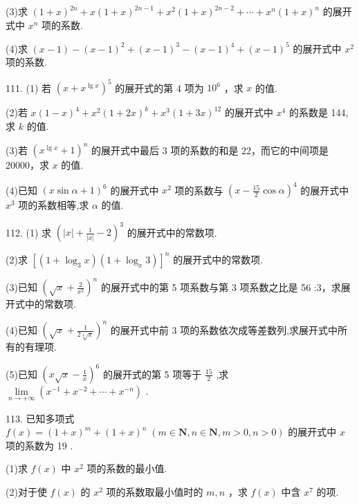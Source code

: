 \documentclass[10pt]{article}
\begin{document}
(3)求 \({\left( 1 + x\right) }^{2n} + x{\left( 1 + x\right) }^{{2n} - 1} + {x}^{2}{\left( 1 + x\right) }^{{2n} - 2} + \cdots  + {x}^{n}{\left( 1 + x\right) }^{n}\) 的展开式中 \({x}^{n}\) 项的系数.

(4)求 \(\left( {x - 1}\right)  - {\left( x - 1\right) }^{2} + {\left( x - 1\right) }^{3} - {\left( x - 1\right) }^{4} + {\left( x - 1\right) }^{5}\) 的展开式中 \({x}^{2}\) 项的系数.

111. (1) 若 \({\left( x + {x}^{\lg x}\right) }^{5}\) 的展开式的第 4 项为 \({10}^{6}\) ，求 \(x\) 的值.

(2)若 \(x{\left( 1 - x\right) }^{4} + {x}^{2}{\left( 1 + 2x\right) }^{k} + {x}^{3}{\left( 1 + 3x\right) }^{12}\) 的展开式中 \({x}^{4}\) 的系数是 144,求 \(k\) 的值.

(3)若 \({\left( {x}^{\lg x} + 1\right) }^{n}\) 的展开式中最后 3 项的系数的和是 22，而它的中间项是 20000，求 \(x\) 的值.

(4)已知 \({\left( x\sin \alpha  + 1\right) }^{6}\) 的展开式中 \({x}^{2}\) 项的系数与 \({\left( x - \frac{15}{2}\cos \alpha \right) }^{4}\) 的展开式中 \({x}^{3}\) 项的系数相等,求 \(\alpha\) 的值.

112. (1) 求 \({\left( \left| x\right|  + \frac{1}{\left| x\right| } - 2\right) }^{3}\) 的展开式中的常数项.

(2)求 \({\left\lbrack  \left( 1 + {\log }_{3}x\right) \left( 1 + {\log }_{x}3\right) \right\rbrack  }^{n}\) 的展开式中的常数项.

(3)已知 \({\left( \sqrt{x} + \frac{2}{{x}^{2}}\right) }^{n}\) 的展开式中的第 5 项系数与第 3 项系数之比是 56 :3，求展开式中的常数项.

(4)已知 \({\left( \sqrt{x} + \frac{1}{2\sqrt[4]{x}}\right) }^{n}\) 的展开式中前 3 项的系数依次成等差数列,求展开式中所有的有理项.

(5)已知 \({\left( x\sqrt{x} - \frac{1}{x}\right) }^{6}\) 的展开式的第 5 项等于 \(\frac{15}{2}\) ,求 \(\mathop{\lim }\limits_{{n \rightarrow   + \infty }}\left( {{x}^{-1} + {x}^{-2} + \cdots  + {x}^{-n}}\right)\) .

113. 已知多项式 \(f\left( x\right)  = {\left( 1 + x\right) }^{m} + {\left( 1 + x\right) }^{n}\;\left( {m \in  \mathbf{N},n \in  \mathbf{N},m > 0,n > 0}\right)\) 的展开式中 \(x\) 项的系数为 19 .

(1)求 \(f\left( x\right)\) 中 \({x}^{2}\) 项的系数的最小值.

(2)对于使 \(f\left( x\right)\) 的 \({x}^{2}\) 项的系数取最小值时的 \(m,n\) ，求 \(f\left( x\right)\) 中含 \({x}^{7}\) 的项.
\end{document}
